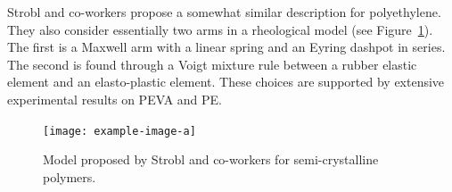 Strobl and co-workers \citep{hongModelTreatingTensile2004, hongModelTreatmentTensile2004, naViscousForceDominatedTensileDeformation2006} propose a somewhat similar description for polyethylene.
They also consider essentially two arms in a rheological model (see Figure~\ref{fig:strobl_model}).
The first is a Maxwell arm with a linear spring and an Eyring dashpot in series.
The second is found through a Voigt mixture rule between a rubber elastic element and an elasto-plastic element.
These choices are supported by extensive experimental results on PEVA and PE.
\begin{figure}
	\centering
	\texttt{[image: example-image-a]}
	\caption{Model proposed by Strobl and co-workers \citep{hongModelTreatingTensile2004, hongModelTreatmentTensile2004, naViscousForceDominatedTensileDeformation2006} for semi-crystalline polymers.}
\label{fig:strobl_model}
\end{figure}

